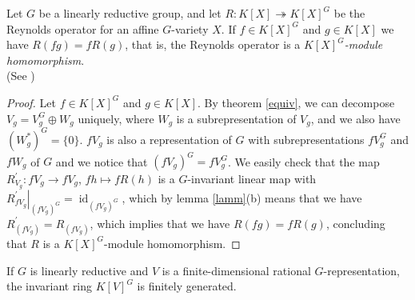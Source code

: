 \begin{proposition}
  Let $G$ be a linearly reductive group, and let $ R \colon K[X] \twoheadrightarrow K[X]^G $ be the Reynolds operator for an affine $G$-variety $X$.
  If $f \in K[X]^G$ and $g \in K[X]$ we have $R(fg) = fR(g)$, that is, the Reynolds operator is a \textit{$K[X]^G$-module homomorphism}.  \\
  (See \cite[2.2.7]{DK15})
\end{proposition}

\begin{proof}
  Let $f \in K[X]^G$ and $g \in K[X]$.
  By theorem \ref{equiv}, we can decompose $V_g = V_g^G \oplus W_g$ uniquely, where $W_g$ is a subrepresentation of $V_g$, and we also have $(W_g^\ast)^G = \{0\}$.
  $fV_g$ is also a representation of $G$ with subrepresentations $fV_g^G$ and $fW_g$ of $G$ and we notice that $(fV_g)^G = fV_g^G$.
  We easily check that the map $R_{V_g}^\prime \colon fV_g \rightarrow fV_g$, $fh \mapsto f R(h)$ is a $G$-invariant linear map with \linebreak$\left. R_{fV_g}^\prime \right|_{(fV_g)^G} = \operatorname{id}_{(fV_g)^G}$, which by lemma \ref{lamm}(b) means that we have \linebreak$R_{(fV_g)}^\prime = R_{(fV_g)}$, which implies that we have $R(fg) = fR(g)$, concluding that $R$ is a $K[X]^G$-module homomorphism.
\end{proof}


\begin{theorem}\label{hilbert}
  If $G$ is linearly reductive and $V$ is a finite-dimensional rational $G$-representation, the invariant ring $K[V]^G$ is finitely generated.
\end{theorem}


